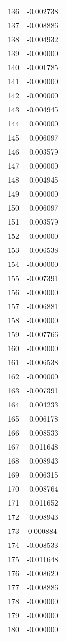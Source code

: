 \documentclass[12pt]{article}
\begin{document}
\begin{longtable}{@{}cc@{}}
136 & -0.002738 \\
137 & -0.008886 \\
138 & -0.004932 \\
139 & -0.000000 \\
140 & -0.001785 \\
141 & -0.000000 \\
142 & -0.000000 \\
143 & -0.004945 \\
144 & -0.000000 \\
145 & -0.006097 \\
146 & -0.003579 \\
147 & -0.000000 \\
148 & -0.004945 \\
149 & -0.000000 \\
150 & -0.006097 \\
151 & -0.003579 \\
152 & -0.000000 \\
153 & -0.006538 \\
154 & -0.000000 \\
155 & -0.007391 \\
156 & -0.000000 \\
157 & -0.006881 \\
158 & -0.000000 \\
159 & -0.007766 \\
160 & -0.000000 \\
161 & -0.006538 \\
162 & -0.000000 \\
163 & -0.007391 \\
164 & -0.004233 \\
165 & -0.006178 \\
166 & -0.008533 \\
167 & -0.011648 \\
168 & -0.008943 \\
169 & -0.006315 \\
170 & -0.008764 \\
171 & -0.011652 \\
172 & -0.008943 \\
173 & 0.000884 \\
174 & -0.008533 \\
175 & -0.011648 \\
176 & -0.008620 \\
177 & -0.008886 \\
178 & -0.000000 \\
179 & -0.000000 \\
180 & -0.000000 \\

\end{longtable}
\end{document}
